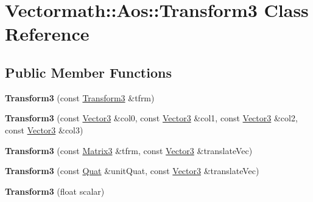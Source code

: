 \hypertarget{class_vectormath_1_1_aos_1_1_transform3}{\section{Vectormath\+:\+:Aos\+:\+:Transform3 Class Reference}
\label{class_vectormath_1_1_aos_1_1_transform3}
}
\subsection*{Public Member Functions}
\begin{DoxyCompactItemize}
\item 
\hypertarget{class_vectormath_1_1_aos_1_1_transform3_aafa1a3ff376c54610ad183b231c32193}{{\bfseries Transform3} (const \hyperlink{class_vectormath_1_1_aos_1_1_transform3}{Transform3} \&tfrm)}\label{class_vectormath_1_1_aos_1_1_transform3_aafa1a3ff376c54610ad183b231c32193}

\item 
\hypertarget{class_vectormath_1_1_aos_1_1_transform3_aede20208cca61cb3153849707fcd05c7}{{\bfseries Transform3} (const \hyperlink{class_vectormath_1_1_aos_1_1_vector3}{Vector3} \&col0, const \hyperlink{class_vectormath_1_1_aos_1_1_vector3}{Vector3} \&col1, const \hyperlink{class_vectormath_1_1_aos_1_1_vector3}{Vector3} \&col2, const \hyperlink{class_vectormath_1_1_aos_1_1_vector3}{Vector3} \&col3)}\label{class_vectormath_1_1_aos_1_1_transform3_aede20208cca61cb3153849707fcd05c7}

\item 
\hypertarget{class_vectormath_1_1_aos_1_1_transform3_a48b610b8feeb0c9a3e93ee050c7c1c6f}{{\bfseries Transform3} (const \hyperlink{class_vectormath_1_1_aos_1_1_matrix3}{Matrix3} \&tfrm, const \hyperlink{class_vectormath_1_1_aos_1_1_vector3}{Vector3} \&translate\+Vec)}\label{class_vectormath_1_1_aos_1_1_transform3_a48b610b8feeb0c9a3e93ee050c7c1c6f}

\item 
\hypertarget{class_vectormath_1_1_aos_1_1_transform3_a54f039ec2e81b7a889897e2e363b8b0a}{{\bfseries Transform3} (const \hyperlink{class_vectormath_1_1_aos_1_1_quat}{Quat} \&unit\+Quat, const \hyperlink{class_vectormath_1_1_aos_1_1_vector3}{Vector3} \&translate\+Vec)}\label{class_vectormath_1_1_aos_1_1_transform3_a54f039ec2e81b7a889897e2e363b8b0a}

\item 
\hypertarget{class_vectormath_1_1_aos_1_1_transform3_a3cb83ed1cf9176ab1ac5b0392d48a9f3}{{\bfseries Transform3} (float scalar)}\label{class_vectormath_1_1_aos_1_1_transform3_a3cb83ed1cf9176ab1ac5b0392d48a9f3}


\end{DoxyCompactItemize}
